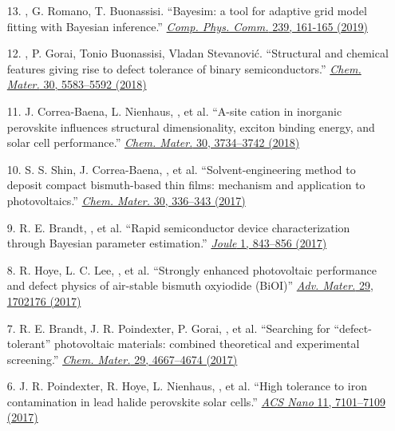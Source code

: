 \begin{enumerate}
        \item[13.] \myname, G. Romano, T. Buonassisi. ``Bayesim: a tool for adaptive grid model fitting with Bayesian inference.'' \href{https://www.sciencedirect.com/science/article/pii/S0010465519300414?via\%3Dihub}{\textit{Comp. Phys. Comm.} 239, 161-165 (2019)}

        \item[12.] \myname\ec, P. Gorai\ec, Tonio Buonassisi, Vladan Stevanovi\'c. ``Structural and chemical features giving rise to defect tolerance of binary semiconductors.'' \href{https://pubs.acs.org/doi/10.1021/acs.chemmater.8b01505}{\textit{Chem. Mater.} 30, 5583--5592 (2018)}

        \item[11.] J. Correa-Baena, L. Nienhaus, \myname, et al. ``A-site cation in inorganic  perovskite influences structural dimensionality, exciton binding energy, and solar cell performance.'' \href{https://pubs.acs.org/doi/10.1021/acs.chemmater.8b00676}{\textit{Chem. Mater.} 30, 3734--3742 (2018)}

        \item[10.] S. S. Shin, J. Correa-Baena, \myname, et al. ``Solvent-engineering method to deposit compact bismuth-based thin films: mechanism and application to photovoltaics.'' \href{https://pubs.acs.org/doi/10.1021/acs.chemmater.7b03227}{\textit{Chem. Mater.} 30, 336--343 (2017)}

        \item[9.] R. E. Brandt, \myname, et al. ``Rapid semiconductor device characterization through Bayesian parameter estimation.'' \href{https://www.sciencedirect.com/science/article/pii/S254243511730096X?via\%3Dihub}{\textit{Joule} 1, 843--856 (2017)}

        \item[8.] R. Hoye, L. C. Lee, \myname, et al. ``Strongly enhanced photovoltaic performance and defect physics of air-stable bismuth oxyiodide (BiOI)'' \href{https://onlinelibrary.wiley.com/doi/full/10.1002/adma.201702176}{\textit{Adv. Mater.} 29, 1702176 (2017)}        

        \item[7.] R. E. Brandt, J. R. Poindexter, P. Gorai, \myname, et al. ``Searching for “defect-tolerant” photovoltaic materials: combined theoretical and experimental screening.'' \href{https://pubs.acs.org/doi/10.1021/acs.chemmater.6b05496}{\textit{Chem. Mater.} 29, 4667--4674 (2017)}

        \item[6.] J. R. Poindexter, R. Hoye, L. Nienhaus, \myname, et al. ``High tolerance to iron contamination in lead halide perovskite solar cells.'' \href{https://pubs.acs.org/doi/10.1021/acsnano.7b02734}{\textit{ACS Nano} 11, 7101--7109 (2017)}


\end{enumerate}
